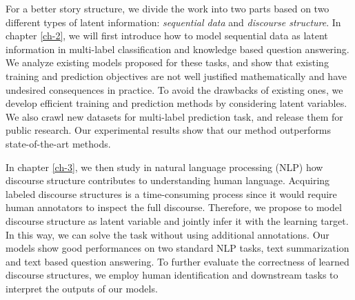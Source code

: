 

For a better story structure, we divide the work into two parts based on two different types of latent information: \textit{sequential data} and \textit{discourse structure}. In chapter \ref{ch-2}, we will first introduce how to model sequential data as latent information in multi-label classification and knowledge based question answering. We analyze existing models proposed for these tasks, and show that existing training and prediction objectives are not well justified mathematically and have undesired consequences in practice. To avoid the drawbacks of existing ones, we develop efficient training and prediction methods by considering latent variables. We also crawl new datasets for multi-label prediction task, and release them for public research. Our experimental results show that our method outperforms state-of-the-art methods. 

In chapter \ref{ch-3}, we then study in natural language processing (NLP) how discourse structure contributes to understanding human language. Acquiring labeled discourse structures is a time-consuming process since it would require human annotators to inspect the full discourse. Therefore, we propose to model discourse structure as latent variable and jointly infer it with the learning target. In this way, we can solve the task without using additional annotations. Our models show good performances on two standard NLP tasks, text summarization and text based question answering. To further evaluate the correctness of learned discourse structures, we employ human identification and downstream tasks to interpret the outputs of our models.